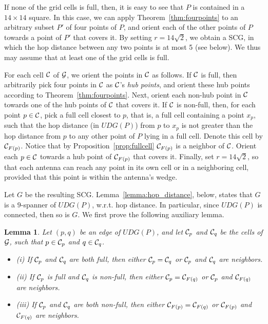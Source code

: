 \documentclass[11pt,letter]{article}
\newtheorem{lemma}[theorem]{Lemma}
\def\clst#1{{\C_{{{F}}({{#1}})}}}
\def\C{{\cal{C}}}
\def\grid{{\cal{G}}}
\def\graph{{{G}}}
\def\UDG{{U\!DG}}
\begin{document}
If none of the grid cells is full, then, it is easy to see that $P$ is contained in a $14 \times 14$ square. In this case, we can apply Theorem~\ref{thm:fourpoints} to an arbitrary subset $P'$ of four points of $P$, and orient each of the other points of $P$ towards a point of $P'$ that covers it. By setting $r = 14 \sqrt{2}$, we obtain a SCG, in which the hop distance between any two points is at most 5 (see below).
We thus may assume that at least one of the grid cells is full.

For each cell $\C$ of $\grid$,
we orient the points in $\C$ as follows.
If $\C$ is full, then arbitrarily pick four points in $\C$ as $\C$'s {\em hub points},
and orient these hub points according to Theorem~\ref{thm:fourpoints}.
Next, orient each non-hub point in $\C$ towards one of the hub points of $\C$ that covers it.
If $\C$ is non-full, then, for each point $p \in \C$,
pick a full cell closest to $p$,
that is, a full cell containing a point $x_p$, such that the hop distance (in $\UDG(P)$) from $p$ to $x_p$ is not greater than the hop distance from $p$ to any other point of $P$ lying in a full cell.
Denote this cell by $\clst{p}$.
Notice that by Proposition~\ref{prop:fullcell} $\clst{p}$ is a neighbor of $\C$.
Orient each $p \in \C$ towards a hub point of $\clst{p}$ that covers it.
Finally, set $r = 14 \sqrt 2$, so that each antenna can reach any point in its own cell or in a neighboring cell, provided that this point is within the antenna's wedge.

Let $\graph$ be the resulting SCG.
Lemma~\ref{lemma:hop_distance}, below, states that $\graph$ is a $9$-spanner of $\UDG(P)$, w.r.t. hop distance.
In particular, since $\UDG(P)$ is connected, then so is $\graph$.
We first prove the following auxiliary lemma.

\begin{lemma}
\label{lemma:neighboring}
Let $(p,q)$ be an edge of $\UDG(P)$,
and let $\C_p$ and $\C_q$ be the cells of $\grid$, such that $p \in \C_p$ and $q \in \C_q$.
\begin{itemize}
	\item[]
	(i)  	If $\C_p$ and $\C_q$ are both full, then either $\C_p = \C_q$ or $\C_p$ and $\C_q$ are neighbors.
	\item[]
	(ii) 	If $\C_p$ is full and $\C_q$ is non-full, then either $\C_p = \clst{q}$ or $\C_p$ and $\clst{q}$ are neighbors.
	\item[]
	(iii) If $\C_p$ and $\C_q$ are both non-full, then either $\clst{p} = \clst{q}$ or $\clst{p}$ and $\clst{q}$ are neighbors.
\end{itemize}			
\end{lemma}
\end{document}
